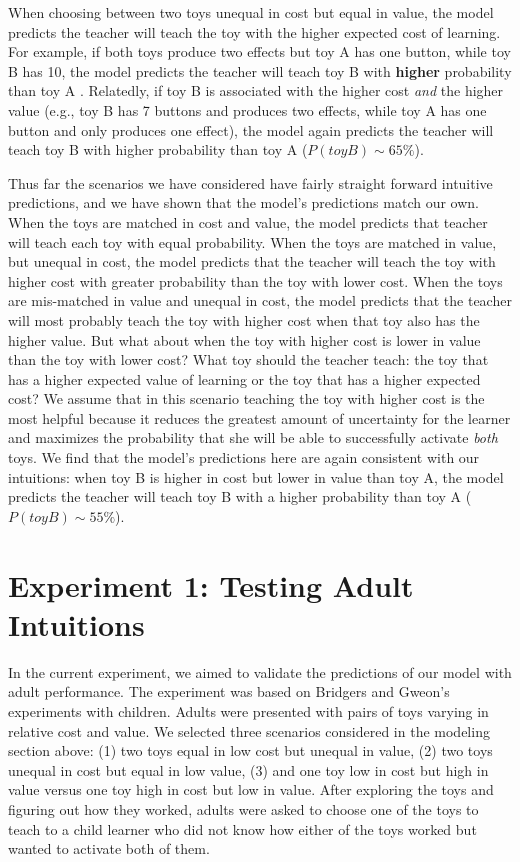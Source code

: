 \documentclass[10pt,letterpaper]{article}
\begin{document}
When choosing between two toys unequal in cost but equal in value, the model predicts the teacher will teach the toy with the higher expected cost of learning. For example, if both toys produce two effects but toy A has one button, while toy B has 10, the model predicts the teacher will teach toy B with \textbf{higher} probability than toy A . Relatedly, if toy B is associated with the higher cost \textit{and} the higher value (e.g., toy B has 7 buttons and produces two effects, while toy A has one button and only produces one effect), the model again predicts the teacher will teach toy B with higher probability than toy A ($P(toyB) \sim 65\%$).

Thus far the scenarios we have considered have fairly straight forward intuitive predictions, and we have shown that the model's predictions match our own. When the toys are matched in cost and value, the model predicts that teacher will teach each toy with equal probability. When the toys are matched in value, but unequal in cost, the model predicts that the teacher will teach the toy with higher cost with greater probability than the toy with lower cost. When the toys are mis-matched in value and unequal in cost, the model predicts that the teacher will most probably teach the toy with higher cost when that toy also has the higher value. But what about when the toy with higher cost is lower in value than the toy with lower cost? What toy should the teacher teach: the toy that has a higher expected value of learning or the toy that has a higher expected cost? We assume that in this scenario teaching the toy with higher cost is the most helpful because it reduces the greatest amount of uncertainty for the learner and maximizes the probability that she will be able to successfully activate \textit{both} toys. We find that the model's predictions here are again consistent with our intuitions: when toy B is higher in cost but lower in value than toy A, the model predicts the teacher will teach toy B with a higher probability than toy A ($P(toyB) \sim 55\%$).

\section{Experiment 1: Testing Adult Intuitions}

In the current experiment, we aimed to validate the predictions of our model with adult performance. The experiment was based on Bridgers and Gweon's experiments with children. Adults were presented with pairs of toys varying in relative cost and value. We selected three scenarios considered in the modeling section above: (1) two toys equal in low cost but unequal in value, (2) two toys unequal in cost but equal in low value, (3) and one toy low in cost but high in value versus one toy high in cost but low in value. After exploring the toys and figuring out how they worked, adults were asked to choose one of the toys to teach to a child learner who did not know how either of the toys worked but wanted to activate both of them. 
\end{document}
